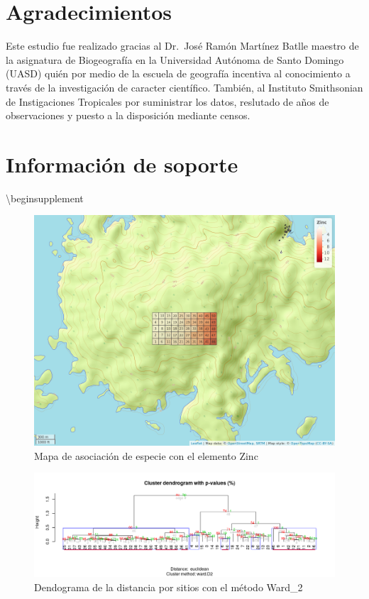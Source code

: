 \documentclass[11pt,]{article}
\newenvironment{Shaded}{\begin{snugshade}}{\end{snugshade}}
\newcommand{\NormalTok}[1]{#1}
\begin{document}
\section{Agradecimientos}\label{agradecimientos}

Este estudio fue realizado gracias al Dr.~José Ramón Martínez Batlle
maestro de la asignatura de Biogeografía en la Universidad Autónoma de
Santo Domingo (UASD) quién por medio de la escuela de geografía
incentiva al conocimiento a través de la investigación de caracter
científico. También, al Instituto Smithsonian de Instigaciones
Tropicales por suministrar los datos, reslutado de años de observaciones
y puesto a la disposición mediante censos.

\section{Información de soporte}\label{informaciuxf3n-de-soporte}

\begin{Shaded}
\begin{Highlighting}[]
\NormalTok{\textbackslash{}beginsupplement}
\end{Highlighting}
\end{Shaded}

\begin{figure}
\centering
\includegraphics{mapa_zinc.png}
\caption{\label{fig:soporte1} Mapa de asociación de especie con el
elemento Zinc}
\end{figure}

\begin{figure}
\centering
\includegraphics[width=1.05000\textwidth]{Dendrograma_analisis_agrpado_2.png}
\caption{\label{fig:soporte1} Dendograma de la distancia por sitios con
el método Ward\_2}
\end{figure}
\end{document}
